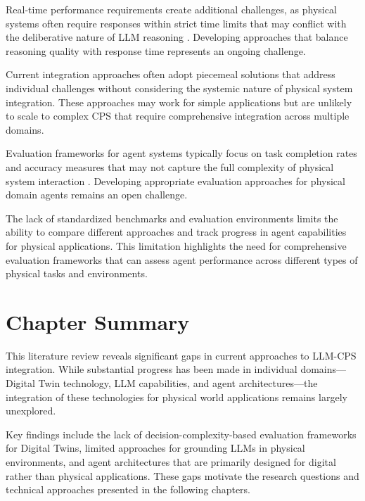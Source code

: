 Real-time performance requirements create additional challenges, as physical systems often require responses within strict time limits that may conflict with the deliberative nature of LLM reasoning \cite{buttazzo2011hard}. Developing approaches that balance reasoning quality with response time represents an ongoing challenge.

Current integration approaches often adopt piecemeal solutions that address individual challenges without considering the systemic nature of physical system integration. These approaches may work for simple applications but are unlikely to scale to complex CPS that require comprehensive integration across multiple domains.

Evaluation frameworks for agent systems typically focus on task completion rates and accuracy measures that may not capture the full complexity of physical system interaction \cite{liu2023agentbench}. Developing appropriate evaluation approaches for physical domain agents remains an open challenge.

The lack of standardized benchmarks and evaluation environments limits the ability to compare different approaches and track progress in agent capabilities for physical applications. This limitation highlights the need for comprehensive evaluation frameworks that can assess agent performance across different types of physical tasks and environments.

\section{Chapter Summary}

This literature review reveals significant gaps in current approaches to LLM-CPS integration. While substantial progress has been made in individual domains—Digital Twin technology, LLM capabilities, and agent architectures—the integration of these technologies for physical world applications remains largely unexplored.

Key findings include the lack of decision-complexity-based evaluation frameworks for Digital Twins, limited approaches for grounding LLMs in physical environments, and agent architectures that are primarily designed for digital rather than physical applications. These gaps motivate the research questions and technical approaches presented in the following chapters.